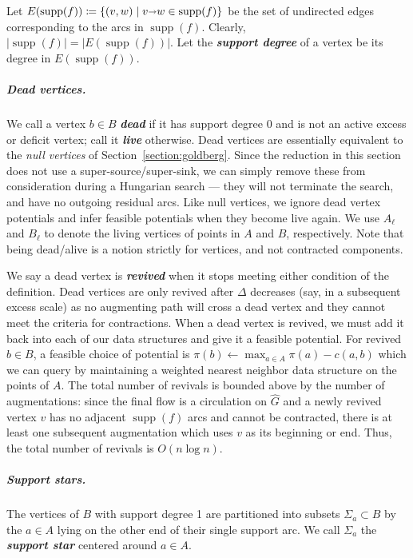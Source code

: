 \documentclass[a4paper,UKenglish]{socg-lipics-v2018}
\def\abs#1{\mathopen| #1 \mathclose|}		%
\def\arcto{\mathord\shortrightarrow}
\def\arc#1#2{#1\arcto#2}
\def\supp{\operatorname{supp}}
\theoremstyle{plain}
\numberwithin{figure}{section}
\renewcommand{\paragraph}{\subparagraph}
\def\EMPH#1{\textbf{\emph{\boldmath #1}}}
\begin{document}
Let $E(\supp(f)) \coloneqq \{(v, w) \mid \arc vw \in \supp(f)\}$ be the set
of undirected edges corresponding to the arcs in $\supp(f)$.
Clearly, $\abs{\supp(f)} = \abs{E(\supp(f))}$.
Let the \EMPH{support degree} of a vertex be its degree in $E(\supp(f))$.

\paragraph{Dead vertices.}
We call a vertex $b \in B$ \EMPH{dead} if it has support degree $0$ and is not an
active excess or deficit vertex; call it \EMPH{live} otherwise.
Dead vertices are essentially equivalent to the \emph{null vertices} of
Section~\ref{section:goldberg}.
Since the reduction in this section does not use a super-source/super-sink,
we can simply remove these from consideration during a Hungarian search ---
they will not terminate the search, and have no outgoing residual arcs.
Like null vertices, we ignore dead vertex potentials and infer feasible
potentials when they become live again.
We use \EMPH{$A_\ell$} and \EMPH{$B_\ell$} to denote the living
vertices of points in $A$ and $B$, respectively.
Note that being dead/alive is a notion strictly for vertices, and not
contracted components.

We say a dead vertex is \EMPH{revived} when it stops meeting either condition
of the definition.
Dead vertices are only revived after $\Delta$ decreases (say, in a
subsequent excess scale) as no augmenting path will cross a dead vertex and
they cannot meet the criteria for contractions.
When a dead vertex is revived, we must add it back into each of our data
structures and give it a feasible potential.
For revived $b \in B$, a feasible choice of potential is
$\pi(b) \gets \max_{a \in A} \pi(a) - c(a, b)$ which we can query by
maintaining a weighted nearest neighbor data structure on the points of $A$.
The total number of revivals is bounded above by the number of augmentations:
since the final flow is a circulation on $\hat{G}$ and a newly revived vertex
$v$ has no adjacent $\supp(f)$ arcs and cannot be contracted, there is at least
one subsequent augmentation which uses $v$ as its beginning or end.
Thus, the total number of revivals is $O(n\log n)$.

\paragraph{Support stars.}
The vertices of $B$ with support degree 1 are partitioned into subsets
$\Sigma_a \subset B$ by the $a \in A$ lying on the other end of their single
support arc.
We call $\Sigma_a$ the \EMPH{support star} centered around $a \in A$.
\end{document}
